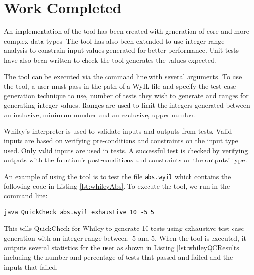 \section{Work Completed}\label{section:work}



An implementation of the tool has been created with generation of core and more complex data types. 
The tool has also been extended to use integer range analysis to constrain input values generated for better performance. 
Unit tests have also been written to check the tool generates the values expected.

The tool can be executed via the command line with several arguments. To use the tool, a user must pass in the path of a WyIL file and specify the test case generation technique to use, number of tests they wish to generate and ranges for generating integer values. Ranges are used to limit the integers generated between an inclusive, minimum number and an exclusive, upper number.

Whiley's interpreter is used to validate inputs and outputs from tests. Valid inputs are based on verifying pre-conditions and constraints on the input type used. Only valid inputs are used in tests. A successful test is checked by verifying outputs with the function's post-conditions and constraints on the outputs' type.


An example of using the tool is to test the file \texttt{abs.wyil} which contains the following code in Listing \ref{lst:whileyAbs}.
To execute the tool, we run in the command line: 
\begin{verbatim}
java QuickCheck abs.wyil exhaustive 10 -5 5
\end{verbatim}

This tells QuickCheck for Whiley to generate 10 tests using exhaustive test case generation with an integer range between -5 and 5. 
When the tool is executed, it outputs several statistics for the user as shown in Listing \ref{lst:whileyQCResults} including the number and percentage of tests that passed and failed and the inputs that failed.

